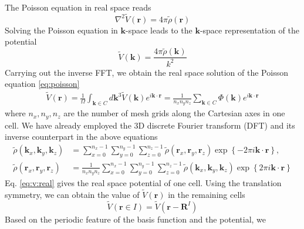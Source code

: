 \documentclass{article}
\begin{document}
The Poisson equation in real space reads
\begin{equation}
  \nabla^2 \tilde{V}(\mathbf{r}) = 4\pi \tilde{\rho}(\mathbf{r})
  \label{eq:poisson}
\end{equation}
Solving the Poisson equation in $\mathbf{k}$-space leads to
the $\mathbf{k}$-space representation of the potential
\begin{equation}
  \tilde{V}(\mathbf{k})=\frac{4\pi\tilde{\rho}(\mathbf{k})}{k^2}
  \label{}
\end{equation}
Carrying out the inverse FFT, we obtain the real space solution of the Poisson
equation \eqref{eq:poisson}
\begin{align}
  \tilde{V}(\mathbf{r})
  =\frac{1}{\Omega}\int_{\mathbf{k}\in C} d\mathbf{k}^3
  \tilde{V}(\mathbf{k}) e^{i\mathbf{k}\cdot\mathbf{r}}
  =\frac{1}{n_xn_yn_z}\sum_{\mathbf{k}\in C}
  \Phi(\mathbf{k}) e^{i\mathbf{k}\cdot \mathbf{r}}
  \label{eq:v:real}
\end{align}
where $n_x,n_y,n_z$ are the number of mesh grids along the Cartesian axes in
one cell.  We have already employed the 3D discrete Fourier transform (DFT)
and its inverse counterpart in the above equations
\begin{align}
  \tilde{\rho}(\mathbf{k}_x,\mathbf{k}_y,\mathbf{k}_z)
  &=\sum_{x=0}^{n_x-1} \sum_{y=0}^{n_y-1} \sum_{z=0}^{n_z-1}
  \tilde{\rho}(\mathbf{r}_x,\mathbf{r}_y,\mathbf{r}_z)
  \exp\left\{-2\pi i \mathbf{k}\cdot\mathbf{r}\right\},
  \\
  \tilde{\rho}(\mathbf{r}_x,\mathbf{r}_y,\mathbf{r}_z)
  &=\frac{1}{n_xn_yn_z}\sum_{x=0}^{n_x-1}
  \sum_{y=0}^{n_y-1} \sum_{z=0}^{n_z-1}
  \tilde{\rho}(\mathbf{k}_x,\mathbf{k}_y,\mathbf{k}_z)
  \exp\left\{2\pi i \mathbf{k}\cdot \mathbf{r}\right\}
  \label{}
\end{align}
Eq. \eqref{eq:v:real} gives the real space potential of one cell.
Using the translation symmetry, we can obtain the value of
$\tilde{V}(\mathbf{r})$ in the remaining cells
\begin{equation}
  \tilde{V}(\mathbf{r}\in I) = \tilde{V}(\mathbf{r}-\mathbf{R}^I)
  \label{}
\end{equation}
Based on the periodic feature of the basis function and the potential, we
\end{document}
